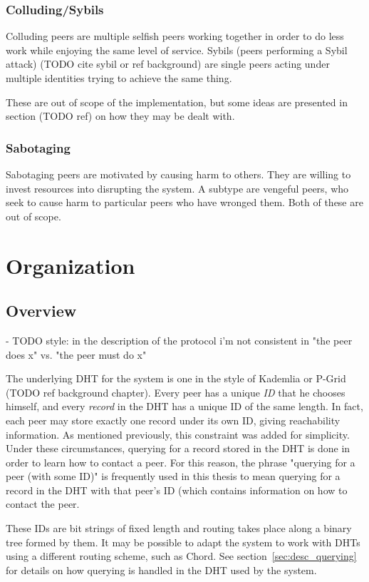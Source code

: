 \subsubsection{Colluding/Sybils}
Colluding peers are multiple selfish peers working together in order to do less
work while enjoying the same level of service. Sybils (peers performing a Sybil
attack) (TODO cite sybil or ref background) are single peers acting under
multiple identities trying to achieve the same thing.

These are out of scope of the implementation, but some ideas are presented in
section (TODO ref) on how they may be dealt with.

\subsubsection{Sabotaging}
Sabotaging peers are motivated by causing harm to others. They are willing to
invest resources into disrupting the system. A subtype are vengeful peers, who
seek to cause harm to particular peers who have wronged them. Both of these are
out of scope.

\section{Organization}
\subsection{Overview}
- TODO style: in the description of the protocol i'm not consistent in "the peer
  does x" vs. "the peer must do x"

The underlying \ac{DHT} for the system is one in the style of Kademlia or P-Grid
(TODO ref background chapter). Every peer has a unique \emph{ID} that he chooses
himself, and every \emph{record} in the \ac{DHT} has a unique ID of the same
length. In fact, each peer may store exactly one record under its own ID, giving
reachability information. As mentioned previously, this constraint was added for
simplicity. Under these circumstances, querying for a record stored in the
\ac{DHT} is done in order to learn how to contact a peer. For this reason, the
phrase "querying for a peer (with some ID)" is frequently used in this thesis to
mean querying for a record in the \ac{DHT} with that peer's ID (which contains
information on how to contact the peer.

These IDs are bit strings of fixed length and routing takes place
along a binary tree formed by them. It may be possible to adapt the system to
work with \acp{DHT} using a different routing scheme, such as Chord. See
section~\ref{sec:desc_querying} for details on how querying is handled in the
\ac{DHT} used by the system.

